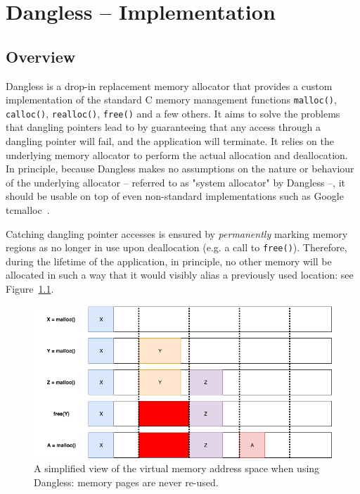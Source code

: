 \chapter{Dangless -- Implementation}
\label{ch:implementation}

\section{Overview}

Dangless is a drop-in replacement memory allocator that provides a custom implementation of the standard C memory management functions \lstinline!malloc()!, \lstinline!calloc()!, \lstinline!realloc()!, \lstinline!free()! and a few others. It aims to solve the problems that dangling pointers lead to by guaranteeing that any access through a dangling pointer will fail, and the application will terminate. It relies on the underlying memory allocator to perform the actual allocation and deallocation. In principle, because Dangless makes no assumptions on the nature or behaviour of the underlying allocator -- referred to as "system allocator" by Dangless --, it should be usable on top of even non-standard implementations such as Google tcmalloc~\cite{google-tcmalloc}.

Catching dangling pointer accesses is ensured by \emph{permanently} marking memory regions as no longer in use upon deallocation (e.g. a call to \lstinline!free()!). Therefore, during the lifetime of the application, in principle, no other memory will be allocated in such a way that it would visibly alias a previously used location: see Figure~\ref{fig:dangless_simplified}.

\begin{figure}
	\centering
	\includegraphics[width=\textwidth]{img/dangless_simplified.png}
	\caption{A simplified view of the virtual memory address space when using Dangless: memory pages are never re-used.}
	\label{fig:dangless_simplified}
\end{figure}

